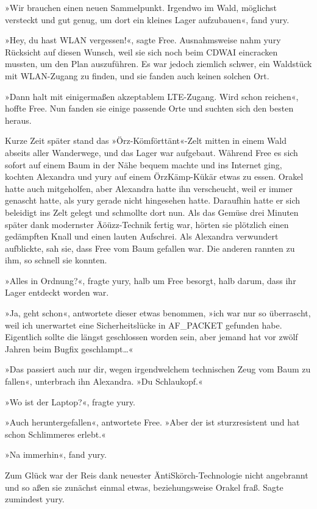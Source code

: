 »Wir brauchen einen neuen Sammelpunkt. Irgendwo im Wald, möglichst versteckt und gut genug, um dort ein kleines Lager aufzubauen«, fand yury.

»Hey, du hast WLAN vergessen!«, sagte Free. Ausnahmsweise nahm yury Rücksicht auf diesen Wunsch, weil sie sich noch beim CDWAI eincracken mussten, um den Plan auszuführen. Es war jedoch ziemlich schwer, ein Waldstück mit WLAN-Zugang zu finden, und sie fanden auch keinen solchen Ort.

»Dann halt mit einigermaßen akzeptablem LTE-Zugang. Wird schon reichen«, hoffte Free. Nun fanden sie einige passende Orte und suchten sich den besten heraus.

Kurze Zeit später stand das »Örz-Kömförttänt«-Zelt mitten in einem Wald abseits aller Wanderwege, und das Lager war aufgebaut. Während Free es sich sofort auf einem Baum in der Nähe bequem machte und ins Internet ging, kochten Alexandra und yury auf einem ÖrzKämp-Kükär etwas zu essen. Orakel hatte auch mitgeholfen, aber Alexandra hatte ihn verscheucht, weil er immer genascht hatte, als yury gerade nicht hingesehen hatte. Daraufhin hatte er sich beleidigt ins Zelt gelegt und schmollte dort nun. Als das Gemüse drei Minuten später dank modernster Äöüzz-Technik fertig war, hörten sie plötzlich einen gedämpften Knall und einen lauten Aufschrei. Als Alexandra verwundert aufblickte, sah sie, dass Free vom Baum gefallen war. Die anderen rannten zu ihm, so schnell sie konnten.

»Alles in Ordnung?«, fragte yury, halb um Free besorgt, halb darum, dass ihr Lager entdeckt worden war.

»Ja, geht schon«, antwortete dieser etwas benommen, »ich war nur so überrascht, weil ich unerwartet eine Sicherheitslücke in AF\_PACKET gefunden habe. Eigentlich sollte die längst geschlossen worden sein, aber jemand hat vor zwölf Jahren beim Bugfix geschlampt…«

»Das passiert auch nur dir, wegen irgendwelchem technischen Zeug vom Baum zu fallen«, unterbrach ihn Alexandra. »Du Schlaukopf.«

»Wo ist der Laptop?«, fragte yury.

»Auch heruntergefallen«, antwortete Free. »Aber der ist sturzresistent und hat schon Schlimmeres erlebt.«

»Na immerhin«, fand yury.

Zum Glück war der Reis dank neuester ÄntiSkörch-Technologie nicht angebrannt und so aßen sie zunächst einmal etwas, beziehungsweise Orakel fraß. Sagte zumindest yury.

